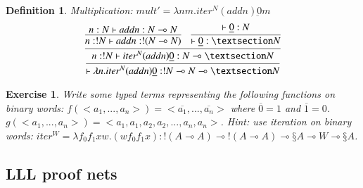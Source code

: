\documentclass[a4paper,10pt]{article}
\newcommand{\limpl}{\multimap}  %
\newtheorem{definition}{Definition}
\newtheorem{exo}{Exercise}
\begin{document}
\begin{definition}
Multiplication: $mult' = \lambda n m. iter^N (add n) \underbar{0} m$
$$ \infer{\vdash \lambda n.iter^N (add n) \underbar{0} : !N \limpl N \limpl §N}{
	\infer{ n:!N \vdash iter^N (add n) \underbar{0} : N \limpl §N}{
		\infer{n:!N \vdash add n : !(N \limpl N)}{ n:N \vdash add n : N \limpl N}
	&
		\infer{\vdash \underbar{0} : §N}{ \vdash \underbar{0} : N}
	}
} $$
\end{definition}

\begin{exo}
Write some typed terms representing the following functions on binary words:
$f(<a_1, ..., a_n>) = <\overline{a_1}, ..., \overline{a_n}>$ where $\overline{0}=1$ and $\overline{1}=0$.
$g(<a_1, ..., a_n>) = <a_1, a_1, a_2, a_2, ..., a_n, a_n>$.
Hint: use iteration on binary words: $iter^W= \lambda f_0 f_1 x w.(w f_0 f_1 x) : !(A \limpl A) \limpl !(A \limpl A) \limpl §A \limpl W \limpl §A$.

\end{exo}


\subsection{LLL proof nets}





\end{document}

